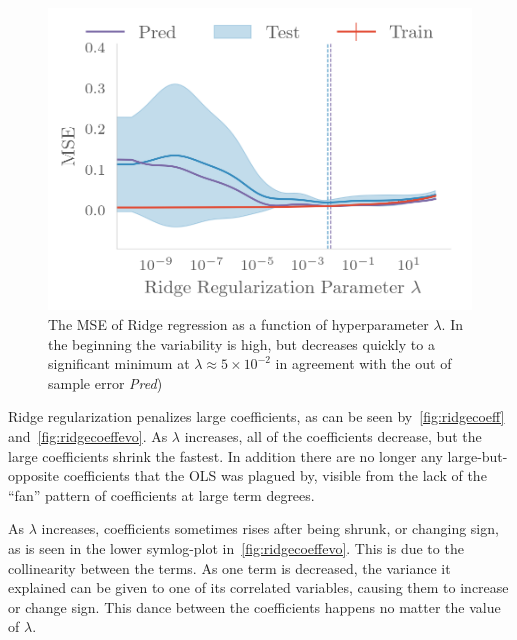 \begin{figure}[]
  \centering
  \includegraphics[]{figures/ridgemse.png}
  \caption{\label{fig:ridgemse} The MSE of Ridge regression as a function of
    hyperparameter \(\lambda\). In the beginning the variability is high, but
    decreases quickly to a significant minimum at \(\lambda\approx 5\times
    10^{-2}\)  in agreement with the out of sample error \textit{Pred})}
\end{figure}

Ridge regularization penalizes large coefficients, as can be seen
by~\cref{fig:ridgecoeff} and~\cref{fig:ridgecoeffevo}. As \(\lambda\) increases,
all of the coefficients decrease, but the large coefficients shrink the
fastest. In addition there are no longer any large-but-opposite coefficients
that the OLS was plagued by, visible from the lack of the ``fan'' pattern of coefficients
at large term degrees. 

As \(\lambda\) increases, coefficients sometimes rises after being shrunk, or
changing sign, as is seen in the lower symlog-plot
in~\cref{fig:ridgecoeffevo}. This is due to the collinearity between the terms.
As one term is decreased, the variance it explained can be given to one of its
correlated variables, causing them to increase or change sign. This dance
between the coefficients happens no matter the value of  \(\lambda\).


